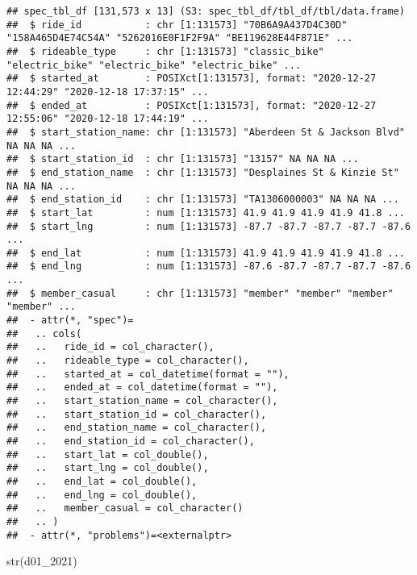 \documentclass[
]{article}
\newenvironment{Shaded}{\begin{snugshade}}{\end{snugshade}}
\newcommand{\FunctionTok}[1]{\textcolor[rgb]{0.00,0.00,0.00}{#1}}
\newcommand{\NormalTok}[1]{#1}
\begin{document}
\begin{verbatim}
## spec_tbl_df [131,573 x 13] (S3: spec_tbl_df/tbl_df/tbl/data.frame)
##  $ ride_id           : chr [1:131573] "70B6A9A437D4C30D" "158A465D4E74C54A" "5262016E0F1F2F9A" "BE119628E44F871E" ...
##  $ rideable_type     : chr [1:131573] "classic_bike" "electric_bike" "electric_bike" "electric_bike" ...
##  $ started_at        : POSIXct[1:131573], format: "2020-12-27 12:44:29" "2020-12-18 17:37:15" ...
##  $ ended_at          : POSIXct[1:131573], format: "2020-12-27 12:55:06" "2020-12-18 17:44:19" ...
##  $ start_station_name: chr [1:131573] "Aberdeen St & Jackson Blvd" NA NA NA ...
##  $ start_station_id  : chr [1:131573] "13157" NA NA NA ...
##  $ end_station_name  : chr [1:131573] "Desplaines St & Kinzie St" NA NA NA ...
##  $ end_station_id    : chr [1:131573] "TA1306000003" NA NA NA ...
##  $ start_lat         : num [1:131573] 41.9 41.9 41.9 41.9 41.8 ...
##  $ start_lng         : num [1:131573] -87.7 -87.7 -87.7 -87.7 -87.6 ...
##  $ end_lat           : num [1:131573] 41.9 41.9 41.9 41.9 41.8 ...
##  $ end_lng           : num [1:131573] -87.6 -87.7 -87.7 -87.7 -87.6 ...
##  $ member_casual     : chr [1:131573] "member" "member" "member" "member" ...
##  - attr(*, "spec")=
##   .. cols(
##   ..   ride_id = col_character(),
##   ..   rideable_type = col_character(),
##   ..   started_at = col_datetime(format = ""),
##   ..   ended_at = col_datetime(format = ""),
##   ..   start_station_name = col_character(),
##   ..   start_station_id = col_character(),
##   ..   end_station_name = col_character(),
##   ..   end_station_id = col_character(),
##   ..   start_lat = col_double(),
##   ..   start_lng = col_double(),
##   ..   end_lat = col_double(),
##   ..   end_lng = col_double(),
##   ..   member_casual = col_character()
##   .. )
##  - attr(*, "problems")=<externalptr>
\end{verbatim}

\begin{Shaded}
\begin{Highlighting}[]
\FunctionTok{str}\NormalTok{(d01\_2021)}
\end{Highlighting}
\end{Shaded}
\end{document}
